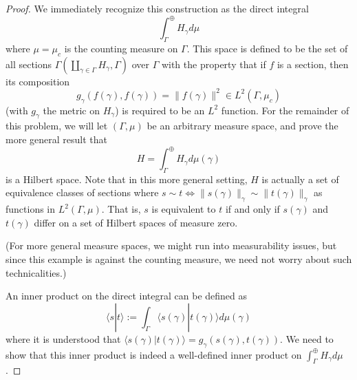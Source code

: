 \documentclass[fontsize=11pt]{scrartcl} %
\numberwithin{equation}{section} %
\numberwithin{figure}{section} %
\numberwithin{table}{section} %
\newcommand{\la}{\langle}
\newcommand{\ra}{\rangle}
\begin{document}
\begin{proof}
    We immediately recognize this construction as the direct integral
    \[
        \int_{\Gamma}^{\oplus}H_{\gamma}d\mu
    \]
    where $\mu=\mu_c$ is the counting measure on $\Gamma$. This space is defined
    to be the set of all sections
    $\Gamma(\coprod_{\gamma\in\Gamma}H_{\gamma},\Gamma)$ over $\Gamma$ with the
    property that if $f$ is a section, then its composition
    \[
        g_{\gamma}(f(\gamma),f(\gamma)) = \|f(\gamma)\|^2\in L^2(\Gamma,\mu_c)
    \]
    (with $g_{\gamma}$ the metric on $H_{\gamma}$)
    is required to be an $L^2$ function. 
    For the remainder of this problem, we will let $(\Gamma,\mu)$ be an
    arbitrary measure space, and prove the more general result that
    \[
        H = \int_{\Gamma}^{\oplus}H_{\gamma}d\mu(\gamma)
    \]
    is a Hilbert space. Note that in this more general setting, $H$ is actually
    a set of equivalence classes of sections where $s\sim t \iff
    \|s(\gamma)\|_{\gamma} \sim \|t(\gamma)\|_{\gamma}$ as functions in
    $L^2(\Gamma,\mu)$.
    That is, $s$ is equivalent to $t$ if and only if $s(\gamma)$ and
    $t(\gamma)$ differ on a set of Hilbert spaces of measure zero.
    
    (For more general measure spaces, we might run into
    measurability issues, but since this example is against the counting
    measure, we need not worry about such technicalities.)

    An inner product on the direct integral can be defined as
    \[
        \la s|t\ra := \int_{\Gamma}\la s(\gamma)|t(\gamma)\ra d\mu(\gamma)
    \]
    where it is understood that $\la s(\gamma)|t(\gamma)\ra =
    g_{\gamma}(s(\gamma),t(\gamma))$.
    We need to show that this inner product is indeed a well-defined inner
    product on $\int_{\Gamma}^{\oplus}H_{\gamma}d\mu$.



\end{proof}
\end{document}
